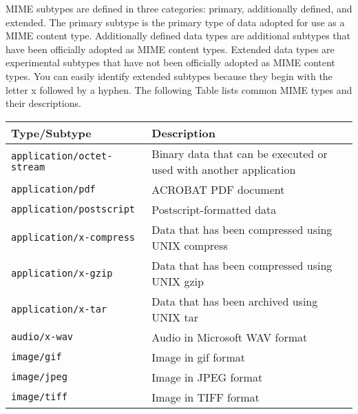 \begin{description}
MIME subtypes are defined in three categories: primary, additionally defined,
and extended. The primary subtype is the primary type of data adopted for use
as a MIME content type. Additionally defined data types are additional subtypes
that have been officially adopted as MIME content types. Extended data types
are experimental subtypes that have not been officially adopted as MIME content
types. You can easily identify extended subtypes because they begin with the
letter x followed by a hyphen. The following Table lists common MIME types and
their descriptions.
\begin{center}
\begin{longtable}{|l|p{9cm}|}
\hline
{\bf Type/Subtype} & {\bf Description}\\\hline 
\verb|application/octet-stream| & Binary data that can be executed or used with another application\\\hline 
\verb|application/pdf| & ACROBAT PDF document\\\hline 
\verb|application/postscript| & Postscript-formatted data\\\hline
\verb|application/x-compress| & Data that has been compressed using UNIX 
compress\\\hline
\verb|application/x-gzip| & Data that has been compressed using UNIX gzip\\\hline
\verb|application/x-tar| & Data that has been archived using UNIX tar\\\hline
\verb|audio/x-wav| & Audio in Microsoft WAV format\\\hline
\verb|image/gif| & Image in gif format\\\hline
\verb|image/jpeg| & Image in JPEG format\\\hline
\verb|image/tiff| & Image in TIFF format\\\hline

\end{longtable}
\end{center}
\end{description}
